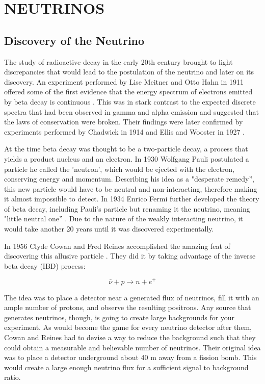 \chapter{\uppercase{Neutrinos}} \label{ch:Neutrinos}

\section{Discovery of the Neutrino} \label{sec:NeutrinoDiscovery}

The study of radioactive decay in the early 20th century brought to light discrepancies that would lead to the postulation of the neutrino and later on its discovery. 
An experiment performed by Lise Meitner and Otto Hahn in 1911 offered some of the first evidence that the energy spectrum of electrons emitted by beta decay is continuous \cite{Hahn:1911}. 
This was in stark contrast to the expected discrete spectra that had been observed in gamma and alpha emission and suggested that the laws of conservation were broken. 
Their findings were later confirmed by experiments performed by Chadwick in 1914 \cite{Chadwick:1914zz} and Ellis and Wooster in 1927 \cite{Ellis:1927}. 

At the time beta decay was thought to be a two-particle decay, a process that yields a product nucleus and an electron.
In 1930 Wolfgang Pauli postulated a particle he called the 'neutron', which would be ejected with the electron, conserving energy and momentum.
Describing his idea as a "desperate remedy'', this new particle would have to be neutral and non-interacting, therefore making it almost impossible to detect.
In 1934 Enrico Fermi further developed the theory of beta decay, including Pauli's particle but renaming it the neutrino, meaning "little neutral one'' \cite{Fermi:1934hr}.
Due to the nature of the weakly interacting neutrino, it would take another 20 years until it was discovered experimentally.

In 1956 Clyde Cowan and Fred Reines accomplished the amazing feat of discovering this allusive particle \cite{Cowan}. They did it by taking advantage of the inverse beta decay (IBD) process:

\begin{equation}
	\bar{\nu} + p \rightarrow n + e^{+}
\end{equation}

The idea was to place a detector near a generated flux of neutrinos, fill it with an ample number of protons, and observe the resulting positrons. 
Any source that generates neutrinos, though, is going to create large backgrounds for your experiment. 
As would become the game for every neutrino detector after them, Cowan and Reines had to devise a way to reduce the background such that they could obtain a measurable and believable number of neutrinos.
Their original idea was to place a detector underground about 40 m away from a fission bomb. 
This would create a large enough neutrino flux for a sufficient signal to background ratio. 

